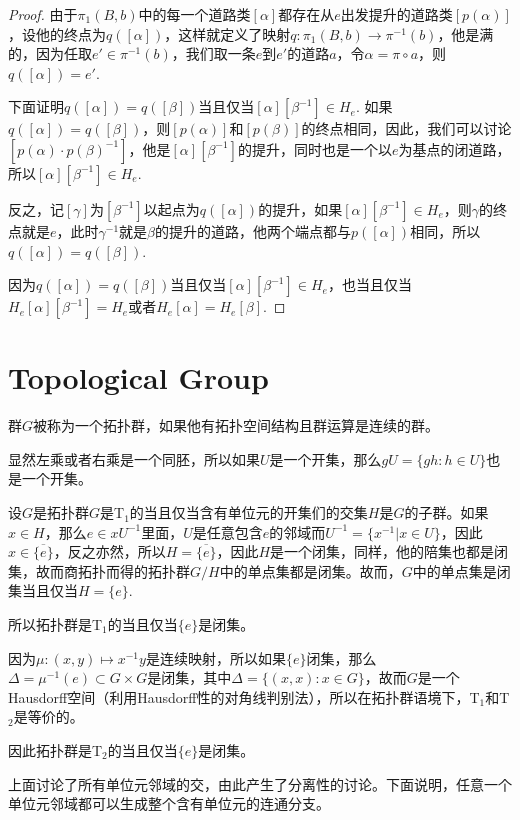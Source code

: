 \begin{proof}
由于$\pi_1(B,b)$中的每一个道路类$[\alpha]$都存在从$e$出发提升的道路类$[p(\alpha)]$，设他的终点为$q([\alpha])$，这样就定义了映射$q:\pi_1(B,b)\to \pi^{-1}(b)$，他是满的，因为任取$e'\in \pi^{-1}(b)$，我们取一条$e$到$e'$的道路$a$，令$\alpha=\pi\circ a$，则$q([\alpha])=e'$.

下面证明$q([\alpha])=q([\beta])$当且仅当$[\alpha][\beta^{-1}]\in H_e$. 如果$q([\alpha])=q([\beta])$，则$[p(\alpha)]$和$[p(\beta)]$的终点相同，因此，我们可以讨论$[p(\alpha)\cdot p(\beta)^{-1}]$，他是$[\alpha][\beta^{-1}]$的提升，同时也是一个以$e$为基点的闭道路，所以$[\alpha][\beta^{-1}]\in H_e$.

反之，记$[\gamma]$为$[\beta^{-1}]$以起点为$q([\alpha])$的提升，如果$[\alpha][\beta^{-1}]\in H_e$，则$\gamma$的终点就是$e$，此时$\gamma^{-1}$就是$\beta$的提升的道路，他两个端点都与$p([\alpha])$相同，所以$q([\alpha])=q([\beta])$.

因为$q([\alpha])=q([\beta])$当且仅当$[\alpha][\beta^{-1}]\in H_e$，也当且仅当$H_e[\alpha][\beta^{-1}]=H_e$或者$H_e[\alpha]=H_e[\beta]$.
\end{proof}

\section*{Topological Group}

\para 群$G$被称为一个拓扑群，如果他有拓扑空间结构且群运算是连续的群。

\para 显然左乘或者右乘是一个同胚，所以如果$U$是一个开集，那么$gU=\{gh:h\in U\}$也是一个开集。

\para 设$G$是拓扑群$G$是T$_1$的当且仅当含有单位元的开集们的交集$H$是$G$的子群。如果$x\in H$，那么$e\in xU^{-1}$里面，$U$是任意包含$e$的邻域而$U^{-1}=\{x^{-1}|x\in U\}$，因此$x\in \overline{\{e\}}$，反之亦然，所以$H=\overline{\{e\}}$，因此$H$是一个闭集，同样，他的陪集也都是闭集，故而商拓扑而得的拓扑群$G/H$中的单点集都是闭集。故而，$G$中的单点集是闭集当且仅当$H=\{e\}$.\endpara

所以拓扑群是T$_1$的当且仅当$\{e\}$是闭集。

\para 因为$\mu:(x,y)\mapsto x^{-1}y$是连续映射，所以如果$\{e\}$闭集，那么$\Delta=\mu^{-1}(e)\subset G\times G$是闭集，其中$\Delta=\{(x,x):x\in G\}$，故而$G$是一个Hausdorff空间（利用Hausdorff性的对角线判别法），所以在拓扑群语境下，T$_1$和T$_2$是等价的。\endpara

因此拓扑群是T$_2$的当且仅当$\{e\}$是闭集。

上面讨论了所有单位元邻域的交，由此产生了分离性的讨论。下面说明，任意一个单位元邻域都可以生成整个含有单位元的连通分支。

